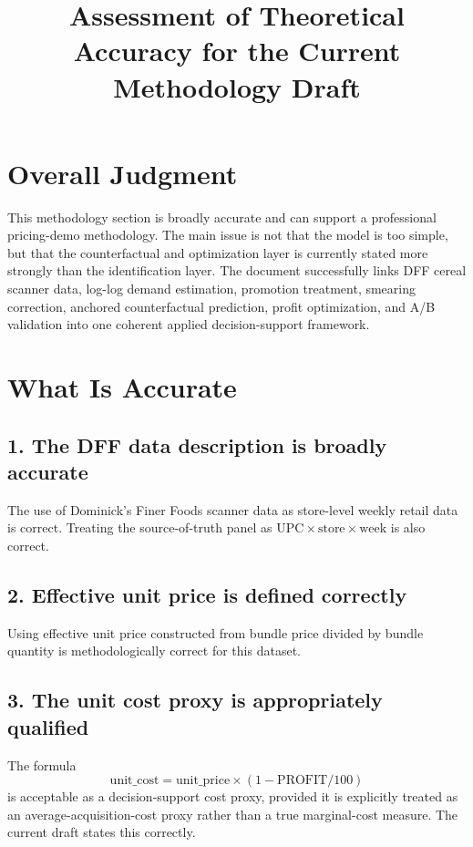 \documentclass[11pt]{article}
\title{Assessment of Theoretical Accuracy for the Current Methodology Draft}
\author{}
\date{}
\begin{document}
\maketitle

\section*{Overall Judgment}

This methodology section is broadly accurate and can support a professional pricing-demo methodology. The main issue is not that the model is too simple, but that the counterfactual and optimization layer is currently stated more strongly than the identification layer. The document successfully links DFF cereal scanner data, log-log demand estimation, promotion treatment, smearing correction, anchored counterfactual prediction, profit optimization, and A/B validation into one coherent applied decision-support framework.

\section*{What Is Accurate}

\subsection*{1. The DFF data description is broadly accurate}
The use of Dominick's Finer Foods scanner data as store-level weekly retail data is correct. Treating the source-of-truth panel as $\text{UPC} \times \text{store} \times \text{week}$ is also correct.

\subsection*{2. Effective unit price is defined correctly}
Using effective unit price constructed from bundle price divided by bundle quantity is methodologically correct for this dataset.

\subsection*{3. The unit cost proxy is appropriately qualified}
The formula
\[
\text{unit\_cost} = \text{unit\_price} \times (1 - \text{PROFIT}/100)
\]
is acceptable as a decision-support cost proxy, provided it is explicitly treated as an average-acquisition-cost proxy rather than a true marginal-cost measure. The current draft states this correctly.
\end{document}
